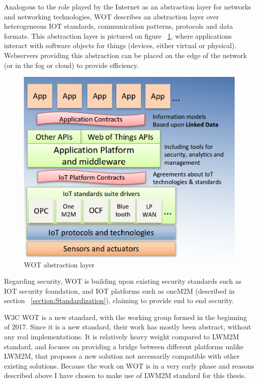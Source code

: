 Analogous to the role played by the Internet as an abstraction layer for networks and networking technologies, WOT describes an abstraction layer over heterogeneous IOT standards, communication patterns, protocols and data formats. This abstraction layer is pictured on figure ~\ref{fig:WOT}, where applications interact with software objects for things (devices, either virtual or physical). Webservers providing this abstraction can be placed on the edge of the network (or in the fog or cloud) to provide efficiency.

\begin{figure}[ht]
	\begin{center}
		\includegraphics[width=\textwidth]{images/WOT}
		\caption{WOT abstraction layer}
		\label{fig:WOT}
	\end{center}
\end{figure}

Regarding security, WOT is building upon existing security standards such as IOT security foundation, and IOT platforms such as oneM2M (described in section ~\ref{section:Standardization}), claiming to provide end to end security. 

W3C WOT is a new standard, with the working group formed in the beginning of 2017. Since it is a new standard, their work has mostly been abstract, without any real implementations. It is relatively heavy weight compared to LWM2M standard, and focuses on providing a bridge between different platforms unlike LWM2M, that proposes a new solution not necessarily compatible with other existing solutions. Because the work on WOT is in a very early phase and reasons described above I have chosen to make use of LWM2M standard for this thesis.

